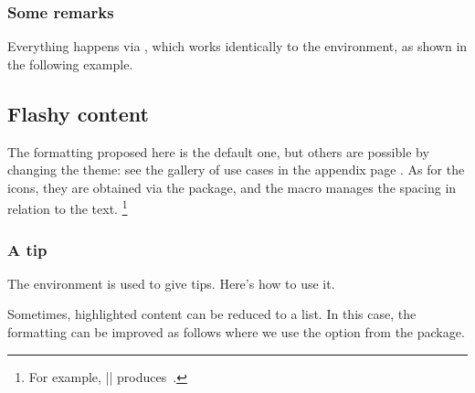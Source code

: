 



\subsubsection{Some remarks}

Everything happens via , which works identically to the  environment, as shown in the following example.




\subsection{Flashy content}
\label{tutodoc-admonitions}

\begin{tdocnote}
    The formatting proposed here is the default one, but others are possible by changing the theme: see the gallery of use cases in the appendix page \pageref{tutodoc-theme-gallery}.
    As for the icons, they are obtained via the  package, and the  macro manages the spacing in relation to the text.
    \footnote{
        For example,
        \tdoclatexin||
        produces
        \,.
    }
\end{tdocnote}


\subsubsection{A tip}

The  environment is used to give tips. Here's how to use it.




\smallskip


\begin{tdoctip}
    Sometimes, highlighted content can be reduced to a list. In this case, the formatting can be improved as follows where we use the  option from the  package.


\end{tdoctip}


